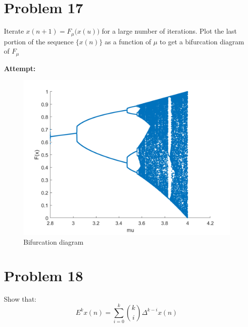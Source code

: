 \documentclass[12pt,letterpaper]{article}
\theoremstyle{definition}
\begin{document}
\section*{Problem 17}

Iterate $x(n+1) = F_\mu \big( x(u) \big)$ for a large number of iterations. Plot the last portion of the sequence $\{x(n)\}$ as a function of $\mu$ to get a bifurcation diagram of $F_\mu$

    
\textbf{Attempt:}
\begin{changemargin}{.5cm}{0cm}
    \begin{figure}[H]
        \centering
        \includegraphics[width=.6\textwidth]{images/problem_17.png}
        \caption{Bifurcation diagram}
        \label{fig:bifurcation}
    \end{figure}
    
\end{changemargin}


\section*{Problem 18}
Show that:
\begin{equation*}
    E^k x(n) = \sum_{i=0}^k {k \choose i} \Delta^{k-i}x(n)
\end{equation*}
\end{document}
